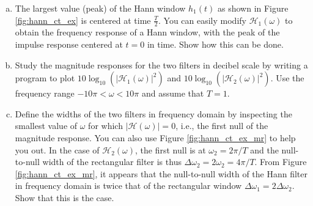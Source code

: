 \begin{enumerate}
\begin{enumerate}[a)]
          \item The largest value (peak) of the Hann window $h_1(t)$ as
                shown in Figure \ref{fig:hann_ct_ex} is centered at time
                $\frac{T}{2}$. You can easily modify $\mathcal{H}_1(\omega)$ to
                obtain the frequency response of a Hann window, with the peak of
                the impulse response centered at $t=0$ in time. Show how this
                can be done.

          \item Study the magnitude responses for the two filters in decibel
                scale by writing a program to plot
                $10 \log_{10}(|\mathcal{H}_1(\omega)|^2)$ and
                $10 \log_{10}(|\mathcal{H}_2(\omega)|^2)$. Use the frequency
                range $-10\pi < \omega < 10\pi$ and assume that $T=1$.

          \item Define the widths of the two filters in frequency domain
                by inspecting the smallest value of $\omega$ for which
                $| \mathcal{H}(\omega)|=0$, i.e., the first null of the
                magnitude response. You can also use
                Figure \ref{fig:hann_ct_ex_mr} to help you out. In the case of
                $\mathcal{H}_2(\omega)$, the first null is at $\omega_2 =
                  2\pi/T$ and the null-to-null width of the rectangular filter is
                thus $\Delta \omega_2 = 2\omega_2 = 4\pi/T$. From
                Figure \ref{fig:hann_ct_ex_mr}, it appears that the
                null-to-null width of the Hann filter in frequency domain is
                twice that of the rectangular window $\Delta \omega_1 =
                  2\Delta \omega_2$. Show that this is the case.


\end{enumerate}
\end{enumerate}
